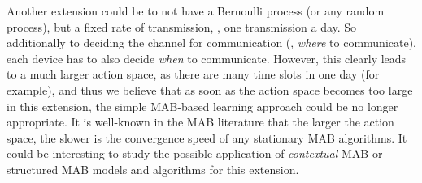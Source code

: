 Another extension could be to not have a Bernoulli process (or any random process), but a fixed rate of transmission, \eg, one transmission a day.
So additionally to deciding the channel for communication (\ie, \emph{where} to communicate), each device has to also decide \emph{when} to communicate.
However, this clearly leads to a much larger action space, as there are many time slots in one day (for example), and thus we believe that as soon as the action space becomes too large in this extension, the simple MAB-based learning approach could be no longer appropriate.
It is well-known in the MAB literature that the larger the action space, the slower is the convergence speed of any stationary MAB algorithms.
It could be interesting to study the possible application of \emph{contextual} MAB \cite{Li10,Luo18} or structured MAB \cite{Combes17} models and algorithms for this extension.








